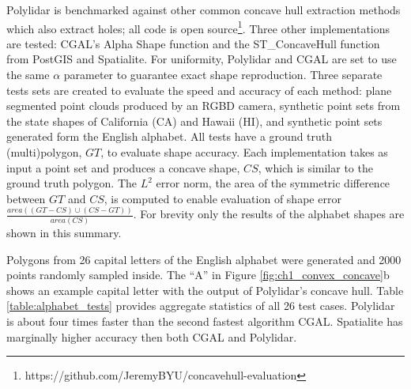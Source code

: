 Polylidar is benchmarked against other common concave hull extraction methods which also extract holes; all code is open source\footnote{https://github.com/JeremyBYU/concavehull-evaluation}. Three other implementations are tested: CGAL's Alpha Shape function and the ST\_ConcaveHull function from PostGIS and Spatialite. For uniformity, Polylidar and CGAL are set to use the same $\alpha$ parameter to guarantee exact shape reproduction. 
Three separate tests sets are created to evaluate the speed and accuracy of each method: plane segmented point clouds produced by an RGBD camera,  synthetic point sets from the state shapes of California (CA) and Hawaii (HI), and synthetic point sets generated form the English alphabet. All tests have a ground truth (multi)polygon, $GT$, to evaluate shape accuracy. Each implementation takes as input a point set and produces a concave shape, $CS$, which is similar to the ground truth polygon.  The $L^2$ error norm, the area of the symmetric difference between $GT$ and $CS$, is computed to enable evaluation of shape error $\frac{area((GT-CS) \cup (CS-GT))}{area(CS)}$. For brevity only the results of the alphabet shapes are shown in this summary. 




Polygons from 26 capital letters of the English alphabet were generated and 2000 points randomly sampled inside.
The ``A'' in Figure \ref{fig:ch1_convex_concave}b shows an example capital letter with the output of Polylidar's concave hull. Table \ref{table:alphabet_tests} provides aggregate statistics of all 26 test cases. Polylidar is about four times faster than the second fastest algorithm CGAL. Spatialite has marginally higher accuracy then both CGAL and Polylidar. 


